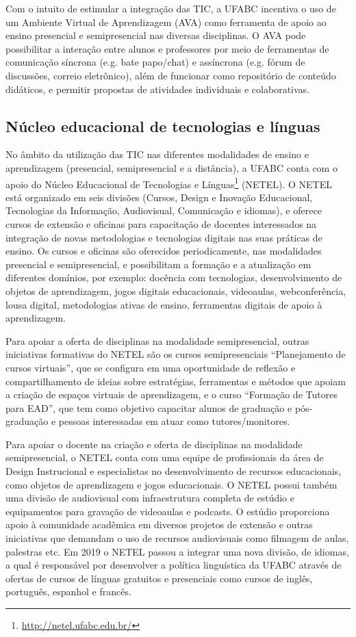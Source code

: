 Com o intuito de estimular a integração das TIC, a UFABC incentiva o uso de um
Ambiente Virtual de Aprendizagem (AVA) como ferramenta de
apoio ao ensino presencial e semipresencial nas diversas disciplinas. 
O AVA pode possibilitar a interação entre alunos e professores por meio de
ferramentas de comunicação síncrona (e.g. bate papo/chat) e assíncrona (e.g.
fórum de discussões, correio eletrônico), além de funcionar como repositório de
conteúdo didáticos, e permitir propostas de atividades individuais e
colaborativas.

\subsection{Núcleo educacional de tecnologias e línguas}

No âmbito da utilização das TIC nas diferentes modalidades de ensino e
aprendizagem (presencial, semipresencial e a distância), a UFABC conta com o
apoio do Núcleo Educacional de Tecnologias e
Línguas\footnote{\url{http://netel.ufabc.edu.br/}} (NETEL).
O NETEL está organizado em seis divisões (Cursos, Design e Inovação
Educacional, Tecnologias da Informação, Audiovisual, Comunicação e idiomas), e
oferece cursos de extensão e oficinas para capacitação de docentes interessados
na integração de novas metodologias e tecnologias digitais nas suas práticas de
ensino. 
Os cursos e oficinas são oferecidos periodicamente, nas modalidades presencial
e semipresencial, e possibilitam a formação e a atualização em diferentes
domínios, por exemplo: docência com tecnologias, desenvolvimento de objetos de
aprendizagem, jogos digitais educacionais, videoaulas, webconferência, lousa
digital, metodologias ativas de ensino, ferramentas digitais de apoio à
aprendizagem. 

Para apoiar a oferta de disciplinas na modalidade semipresencial, outras
iniciativas formativas do NETEL são os cursos semipresenciais ``Planejamento de
cursos virtuais'', que se configura em uma oportunidade de reflexão e
compartilhamento de ideias sobre estratégias, ferramentas e métodos que apoiam
a criação de espaços virtuais de aprendizagem, e o curso ``Formação de Tutores
para EAD'', que tem como objetivo capacitar alunos de graduação e pós-graduação
e pessoas interessadas em atuar como tutores/monitores. 

Para apoiar o docente na criação e oferta de disciplinas na modalidade
semipresencial, o NETEL conta com uma equipe de profissionais da área de Design
Instrucional e especialistas no desenvolvimento de recursos educacionais, como
objetos de aprendizagem e jogos educacionais. 
O NETEL possui também uma divisão de audiovisual com infraestrutura completa de
estúdio e equipamentos para gravação de videoaulas e podcasts. 
O estúdio proporciona apoio à comunidade acadêmica em diversos projetos de
extensão e outras iniciativas que demandam o uso de recursos audiovisuais como
filmagem de aulas, palestras etc. 
Em 2019 o NETEL passou a integrar uma nova divisão, de idiomas, a qual é
responsável por desenvolver a política linguística da UFABC através de ofertas
de cursos de línguas gratuitos e presenciais como cursos de inglês, português,
espanhol e francês.


